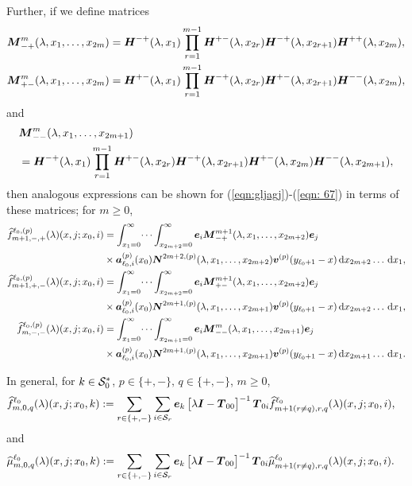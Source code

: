 Further, if we define matrices
\begin{align*}
	\boldsymbol M^{m}_{-+}(\lambda,x_1,\dots,x_{2m}) &= \boldsymbol H^{-+}(\lambda,x_1)\prod_{r=1}^{m-1}\boldsymbol H^{+-}(\lambda,x_{2r}) \boldsymbol H^{-+}(\lambda,x_{2r+1}) \boldsymbol H^{++}(\lambda,x_{2m}),
	\\\boldsymbol M^{m}_{+-}(\lambda,x_1,\dots,x_{2m}) &= \boldsymbol H^{+-}(\lambda,x_1)\prod_{r=1}^{m-1}\boldsymbol H^{-+}(\lambda,x_{2r}) \boldsymbol H^{+-}(\lambda,x_{2r+1}) \boldsymbol H^{--}(\lambda,x_{2m}),
\end{align*}
and
\begin{align*}
	&\boldsymbol M^{m}_{--}(\lambda,x_1,\dots,x_{2m+1}) \nonumber 
	\\&= \boldsymbol H^{-+}(\lambda,x_1)\prod_{r=1}^{m-1}\boldsymbol H^{+-}(\lambda,x_{2r}) \boldsymbol H^{-+}(\lambda,x_{2r+1}) \boldsymbol H^{+-}(\lambda,x_{2m}) 
	\boldsymbol H^{--}(\lambda,x_{2m+1}),\nonumber 
\end{align*}
then analogous expressions can be shown for (\ref{eqn:gljagj})-(\ref{eqn: 67}) in terms of these matrices; for \(m\geq 0\), 
\begin{align*}
	\widehat f^{\ell_0,(p)}_{m+1,-,+}(\lambda)(x, j; x_0,i) &= 
		\int_{x_1=0}^\infty \dots \int_{x_{2m+2}=0}^\infty \boldsymbol e_i\boldsymbol M^{m+1}_{-+}(\lambda,x_1,\dots,x_{2m+2})\boldsymbol e_j \nonumber 
		\\&\times \boldsymbol a_{\ell_0,i}^{(p)}(x_0) \boldsymbol N^{2m+2,(p)}(\lambda,x_1,\dots,x_{2m+2}) {\boldsymbol v}^{(p)}(y_{\ell_0+1}-x)\, \mathrm{d} x_{2m+2}\dots\, \mathrm{d} x_1,
	\\ \widehat f^{\ell_0,(p)}_{m+1,+,-}(\lambda)(x, j; x_0,i) &= 
		\int_{x_1=0}^\infty \dots \int_{x_{2m+2}=0}^\infty \boldsymbol e_i\boldsymbol M^{m+1}_{+-}(\lambda,x_1,\dots,x_{2m+2})\boldsymbol e_j \nonumber 
		\\&\times \boldsymbol a_{\ell_0,i}^{(p)}(x_0) \boldsymbol N^{2m+1,(p)}(\lambda,x_1,\dots,x_{2m+1}) {\boldsymbol v}^{(p)}(y_{\ell_0+1}-x)\, \mathrm{d} x_{2m+2}\dots\, \mathrm{d} x_1,
	\\ \widehat f^{\ell_0,(p)}_{m,-,-}(\lambda)(x, j; x_0,i) &= 
		\int_{x_1=0}^\infty \dots \int_{x_{2m+1}=0}^\infty \boldsymbol e_i\boldsymbol M^m_{--}(\lambda,x_1,\dots,x_{2m+1})\boldsymbol e_j \nonumber 
		\\&\times \boldsymbol a_{\ell_0,i}^{(p)}(x_0) \boldsymbol N^{2m+1,(p)}(\lambda,x_1,\dots,x_{2m+1}) {\boldsymbol v}^{(p)}(y_{\ell_0+1}-x)\, \mathrm{d} x_{2m+1}\dots\, \mathrm{d} x_1.
\end{align*}

In general, for \(k\in\mathcal{S}_0^*\), \(p\in \{+,-\}, \, q\in\{+,-\}\), \(m\geq 0\),
\begin{align}
	\widehat f_{m,0,q}^{\ell_0}(\lambda)(x,j;x_0,k)  
	&:= \sum_{r\in\{+,-\}}\sum_{i\in\mathcal{S}_r}\boldsymbol e_k\begin{bmatrix} \lambda \boldsymbol I - \boldsymbol T_{00} \end{bmatrix}^{-1}\boldsymbol T_{0i}\widehat f_{m+1(r\neq q),r,q}^{\ell_0}(\lambda)(x,j;x_0,i), \label{eqn: vma}
\end{align}
and
\begin{align}
	\widehat \mu_{m,0,q}^{\ell_0}(\lambda)(x,j;x_0,k) \label{eqn:kdneee}
	&:= \sum_{r\in\{+,-\}}\sum_{i\in\mathcal{S}_r}\boldsymbol e_k\begin{bmatrix} \lambda \boldsymbol I - \boldsymbol T_{00} \end{bmatrix}^{-1}\boldsymbol T_{0i}\widehat \mu_{m+1(r\neq q),r,q}^{\ell_0}(\lambda)(x,j;x_0,i).
\end{align}

